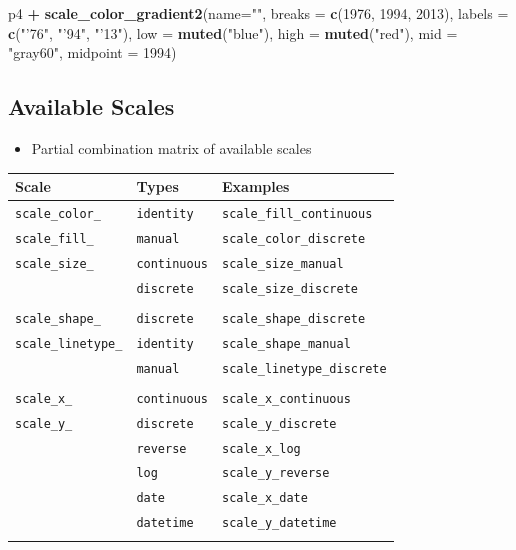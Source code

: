 \documentclass[]{book}
\newenvironment{Shaded}{\begin{snugshade}}{\end{snugshade}}
\newcommand{\KeywordTok}[1]{\textcolor[rgb]{0.13,0.29,0.53}{\textbf{#1}}}
\newcommand{\DataTypeTok}[1]{\textcolor[rgb]{0.13,0.29,0.53}{#1}}
\newcommand{\DecValTok}[1]{\textcolor[rgb]{0.00,0.00,0.81}{#1}}
\newcommand{\StringTok}[1]{\textcolor[rgb]{0.31,0.60,0.02}{#1}}
\newcommand{\OperatorTok}[1]{\textcolor[rgb]{0.81,0.36,0.00}{\textbf{#1}}}
\newcommand{\NormalTok}[1]{#1}
\providecommand{\tightlist}{%
  \setlength{\itemsep}{0pt}\setlength{\parskip}{0pt}}
\begin{document}
\begin{Shaded}
\begin{Highlighting}[]
\NormalTok{p4 }\OperatorTok{+}
\StringTok{  }\KeywordTok{scale_color_gradient2}\NormalTok{(}\DataTypeTok{name=}\StringTok{""}\NormalTok{,}
                        \DataTypeTok{breaks =} \KeywordTok{c}\NormalTok{(}\DecValTok{1976}\NormalTok{, }\DecValTok{1994}\NormalTok{, }\DecValTok{2013}\NormalTok{),}
                        \DataTypeTok{labels =} \KeywordTok{c}\NormalTok{(}\StringTok{"'76"}\NormalTok{, }\StringTok{"'94"}\NormalTok{, }\StringTok{"'13"}\NormalTok{),}
                        \DataTypeTok{low =} \KeywordTok{muted}\NormalTok{(}\StringTok{"blue"}\NormalTok{),}
                        \DataTypeTok{high =} \KeywordTok{muted}\NormalTok{(}\StringTok{"red"}\NormalTok{),}
                        \DataTypeTok{mid =} \StringTok{"gray60"}\NormalTok{,}
                        \DataTypeTok{midpoint =} \DecValTok{1994}\NormalTok{)}
\end{Highlighting}
\end{Shaded}

\subsection{Available Scales}\label{available-scales}

\begin{itemize}
\tightlist
\item
  Partial combination matrix of available scales
\end{itemize}

\begin{longtable}[]{@{}lll@{}}
\toprule
\textbf{Scale} & \textbf{Types} & \textbf{Examples}\tabularnewline
\midrule
\endhead
\texttt{scale\_color\_} & \texttt{identity} &
\texttt{scale\_fill\_continuous}\tabularnewline
\texttt{scale\_fill\_} & \texttt{manual} &
\texttt{scale\_color\_discrete}\tabularnewline
\texttt{scale\_size\_} & \texttt{continuous} &
\texttt{scale\_size\_manual}\tabularnewline
& \texttt{discrete} & \texttt{scale\_size\_discrete}\tabularnewline
& &\tabularnewline
\texttt{scale\_shape\_} & \texttt{discrete} &
\texttt{scale\_shape\_discrete}\tabularnewline
\texttt{scale\_linetype\_} & \texttt{identity} &
\texttt{scale\_shape\_manual}\tabularnewline
& \texttt{manual} & \texttt{scale\_linetype\_discrete}\tabularnewline
& &\tabularnewline
\texttt{scale\_x\_} & \texttt{continuous} &
\texttt{scale\_x\_continuous}\tabularnewline
\texttt{scale\_y\_} & \texttt{discrete} &
\texttt{scale\_y\_discrete}\tabularnewline
& \texttt{reverse} & \texttt{scale\_x\_log}\tabularnewline
& \texttt{log} & \texttt{scale\_y\_reverse}\tabularnewline
& \texttt{date} & \texttt{scale\_x\_date}\tabularnewline
& \texttt{datetime} & \texttt{scale\_y\_datetime}\tabularnewline
& &\tabularnewline
\bottomrule
\end{longtable}
\end{document}
